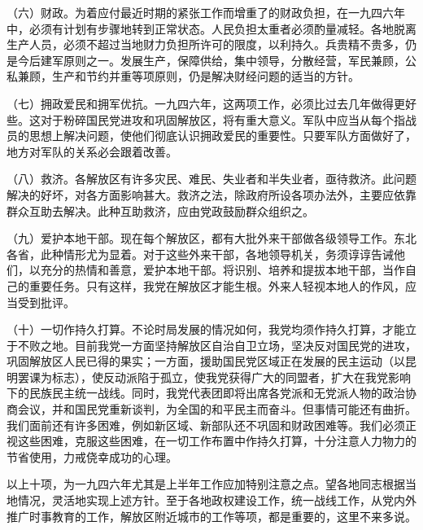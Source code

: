 （六）财政。为着应付最近时期的紧张工作而增重了的财政负担，在一九四六年中，必须有计划有步骤地转到正常状态。人民负担太重者必须酌量减轻。各地脱离生产人员，必须不超过当地财力负担所许可的限度，以利持久。兵贵精不贵多，仍是今后建军原则之一。发展生产，保障供给，集中领导，分散经营，军民兼顾，公私兼顾，生产和节约并重等项原则，仍是解决财经问题的适当的方针。

（七）拥政爱民和拥军优抗。一九四六年，这两项工作，必须比过去几年做得更好些。这对于粉碎国民党进攻和巩固解放区，将有重大意义。军队中应当从每个指战员的思想上解决问题，使他们彻底认识拥政爱民的重要性。只要军队方面做好了，地方对军队的关系必会跟着改善。

（八）救济。各解放区有许多灾民、难民、失业者和半失业者，亟待救济。此问题解决的好坏，对各方面影响甚大。救济之法，除政府所设各项办法外，主要应依靠群众互助去解决。此种互助救济，应由党政鼓励群众组织之。

（九）爱护本地干部。现在每个解放区，都有大批外来干部做各级领导工作。东北各省，此种情形尤为显着。对于这些外来干部，各地领导机关，务须谆谆告诫他们，以充分的热情和善意，爱护本地干部。将识别、培养和提拔本地干部，当作自己的重要任务。只有这样，我党在解放区才能生根。外来人轻视本地人的作风，应当受到批评。

（十）一切作持久打算。不论时局发展的情况如何，我党均须作持久打算，才能立于不败之地。目前我党一方面坚持解放区自治自卫立场，坚决反对国民党的进攻，巩固解放区人民已得的果实；一方面，援助国民党区域正在发展的民主运动（以昆明罢课为标志），使反动派陷于孤立，使我党获得广大的同盟者，扩大在我党影响下的民族民主统一战线。同时，我党代表团即将出席各党派和无党派人物的政治协商会议，并和国民党重新谈判，为全国的和平民主而奋斗。但事情可能还有曲折。我们面前还有许多困难，例如新区域、新部队还不巩固和财政困难等。我们必须正视这些困难，克服这些困难，在一切工作布置中作持久打算，十分注意人力物力的节省使用，力戒侥幸成功的心理。

以上十项，为一九四六年尤其是上半年工作应加特别注意之点。望各地同志根据当地情况，灵活地实现上述方针。至于各地政权建设工作，统一战线工作，从党内外推广时事教育的工作，解放区附近城市的工作等项，都是重要的，这里不来多说。


